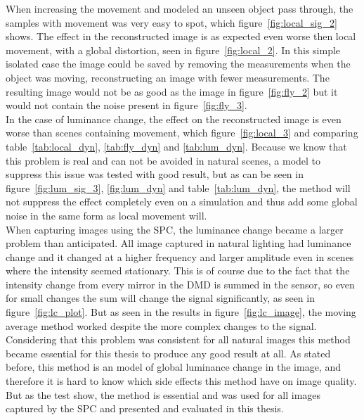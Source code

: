 When increasing the movement and modeled an unseen object pass through, the samples with movement was very easy to spot, which figure~\ref{fig:local_sig_2} shows. The effect in the reconstructed image is as expected even worse then local movement, with a global distortion, seen in figure~\ref{fig:local_2}. In this simple isolated case the image could be saved by removing the measurements when the object was moving, reconstructing an image with fewer measurements. The resulting image would not be as good as the image in figure~\ref{fig:fly_2} but it would not contain the noise present in figure~\ref{fig:fly_3}. \\[0.1in]


In the case of luminance change, the effect on the reconstructed image is even worse than scenes containing movement, which figure~\ref{fig:local_3} and comparing table~\ref{tab:local_dyn}, \ref{tab:fly_dyn} and \ref{tab:lum_dyn}. Because we know that this problem is real and can not be avoided in natural scenes, a model to suppress this issue was tested with good result, but as can be seen in figure~\ref{fig:lum_sig_3}, \ref{fig:lum_dyn} and table~\ref{tab:lum_dyn}, the method will not suppress the effect completely even on a simulation and thus add some global noise in the same form as local movement will.\\[0.1in]

When capturing images using the SPC, the luminance change became a larger problem than anticipated. All image captured in natural lighting had luminance change and it changed at a higher frequency and larger amplitude even in scenes where the intensity seemed stationary. This is of course due to the fact that the intensity change from every mirror in the DMD is summed in the sensor, so even for small changes the sum will change the signal significantly, as seen in figure~\ref{fig:lc_plot}. But as seen in the results in figure~\ref{fig:lc_image}, the moving average method worked despite the more complex changes to the signal. Considering that this problem was consistent for all natural images this method became essential for this thesis to produce any good result at all. As stated before, this method is an model of global luminance change in the image, and therefore it is hard to know which side effects this method have on image quality. But as the test show, the method is essential and was used for all images captured by the SPC and presented and evaluated in this thesis.\\[0.1in]


